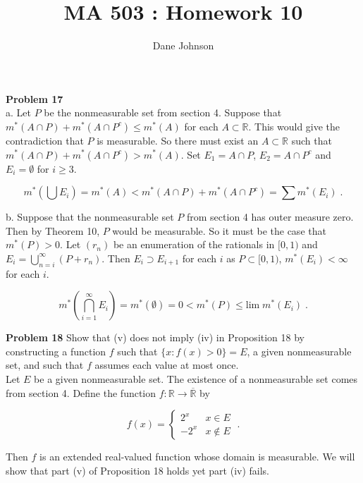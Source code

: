 \documentclass[a4paper]{article}
\title{MA 503 : Homework 10}
\author{Dane Johnson}
\begin{document}
\maketitle


{\bf Problem 17}\\

a. Let $P$ be the nonmeasurable set from section 4. Suppose that $m^*(A\cap P) + m^*(A \cap P^c) \leq m^*(A)$ for each $A \subset \mathbb{R}$. This would give the contradiction that $P$ is measurable. So there must exist an $A \subset \mathbb{R}$ such that $m^*(A \cap P) + m^*(A \cap P^c) > m^*(A)$. Set $E_1 = A\cap P$, $E_2 = A \cap P^c$ and $E_i = \emptyset$ for $i \geq 3$.

$$m^*\left(\bigcup E_i\right) = m^*(A) < m^*(A \cap P) + m^*(A \cap P^c) = \sum m^*(E_i) \;.$$


b. Suppose that the nonmeasurable set $P$ from section 4 has outer measure zero. Then by Theorem 10, $P$ would be measurable. So it must be the case that $m^*(P) > 0$. Let $(r_n)$ be an enumeration of the rationals in $[0,1)$ and $E_i = \bigcup_{n=i}^\infty (P + r_n)$. Then $E_{i} \supset E_{i+1}$ for each $i$  as $P \subset [0,1)$, $m^*(E_i) < \infty$ for each $i$.

$$m^*\left(\bigcap_{i=1}^\infty E_i\right) = m^*(\emptyset) = 0 < m^*(P) \leq \text{lim} \; m^*(E_i) \;.$$

{\bf Problem 18} Show that (v) does not imply (iv) in Proposition 18 by constructing a function $f$ such that $\{x : f(x) > 0 \} = E$, a given nonmeasurable set, and such that $f$ assumes each value at most once. \\

Let $E$ be a given nonmeasurable set. The existence of a nonmeasurable set comes from section 4. Define the function $f: \mathbb{R} \rightarrow \overline{\mathbb{R}}$ by

$$f(x) = \begin{cases} 2^x & x \in E \\ -2^x & x \not\in E \end{cases} \;. $$

Then $f$ is an extended real-valued function whose domain is measurable. We will show that part (v) of Proposition 18 holds yet part (iv) fails. \\
\end{document}
